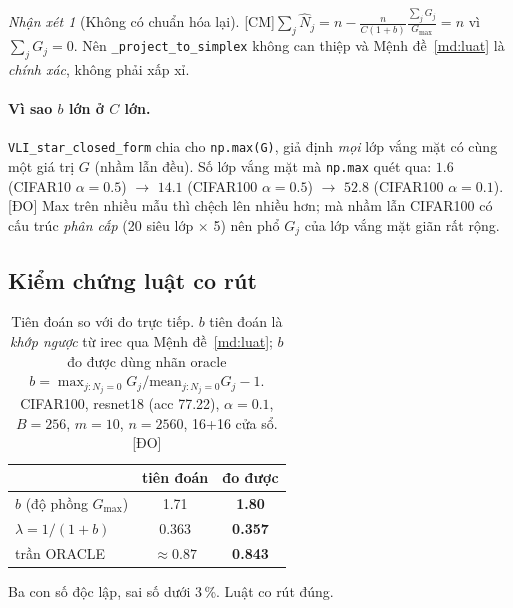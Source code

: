 \documentclass[11pt,a4paper]{article}
\theoremstyle{remark}
\newtheorem{nhanxet}[dinhly]{Nhận xét}
\newcommand{\code}[1]{\texttt{\small #1}}
\newcommand{\CM}{\textsf{[CM]}}
\newcommand{\DO}{\textsf{[ĐO]}}
\begin{document}
\begin{nhanxet}[Không có chuẩn hóa lại] \CM\label{nx:khongchuanhoa}
$\sum_j\hat N_j=n-\frac{n}{C(1+b)}\frac{\sum_j G_j}{G_{\max}}=n$ vì
$\sum_j G_j=0$. Nên \code{\_project\_to\_simplex} không can thiệp và
Mệnh đề~\ref{md:luat} là \emph{chính xác}, không phải xấp xỉ.
\end{nhanxet}

\paragraph{Vì sao $b$ lớn ở $C$ lớn.} \code{VLI\_star\_closed\_form} chia cho
\code{np.max(G)}, giả định \emph{mọi} lớp vắng mặt có cùng một giá trị $G$
(nhầm lẫn đều). Số lớp vắng mặt mà \code{np.max} quét qua:
$1.6$ (CIFAR10 $\alpha{=}0.5$) $\to$ $14.1$ (CIFAR100 $\alpha{=}0.5$) $\to$
$52.8$ (CIFAR100 $\alpha{=}0.1$). \DO{} Max trên nhiều mẫu thì chệch lên nhiều
hơn; mà nhầm lẫn CIFAR100 có cấu trúc \emph{phân cấp} (20 siêu lớp $\times$ 5)
nên phổ $G_j$ của lớp vắng mặt giãn rất rộng.

\subsection{Kiểm chứng luật co rút}

\begin{table}[htbp]
\centering
\caption{Tiên đoán so với đo trực tiếp. $b$ tiên đoán là \emph{khớp ngược} từ
irec qua Mệnh đề~\ref{md:luat}; $b$ đo được dùng nhãn oracle
$b=\max_{j:N_j=0}G_j/\mathrm{mean}_{j:N_j=0}G_j-1$. CIFAR100, resnet18
(acc 77.22), $\alpha=0.1$, $B=256$, $m=10$, $n=2560$, 16+16 cửa sổ. \DO}
\label{tab:kiem}
\small
\begin{tabular}{@{}lcc@{}}
\toprule
 & tiên đoán & \textbf{đo được} \\
\midrule
$b$ (độ phồng $G_{\max}$)      & 1.71  & \textbf{1.80} \\
$\lambda=1/(1+b)$              & 0.363 & \textbf{0.357} \\
trần ORACLE                    & $\approx0.87$ & \textbf{0.843} \\
\bottomrule
\end{tabular}
\end{table}

Ba con số độc lập, sai số dưới 3\,\%. Luật co rút đúng.
\end{document}
